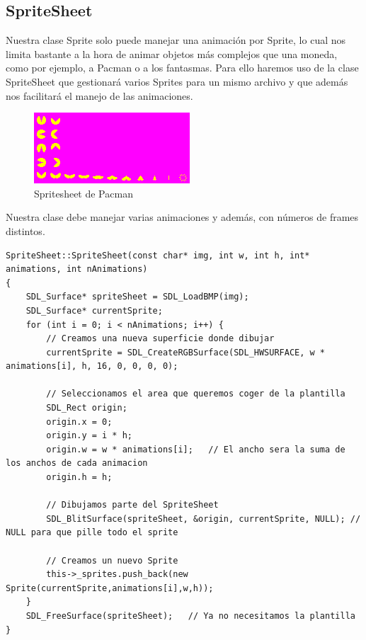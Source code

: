 \documentclass[parskip=half*]{scrartcl}
\begin{document}
	\subsection{SpriteSheet}
		Nuestra clase Sprite solo puede manejar una animaci\'on por Sprite, lo cual nos limita bastante a la hora de animar objetos m\'as complejos que una moneda, como por ejemplo, a Pacman o a los fantasmas. Para ello haremos uso de la clase SpriteSheet que gestionar\'a varios Sprites para un mismo archivo y que adem\'as nos facilitar\'a el manejo de las animaciones.

		\begin{figure}
			\centering
			\includegraphics{MulticocoSDL/img/pacman_example.png}
			\caption{Spritesheet de Pacman}
		\end{figure}

		Nuestra clase debe manejar varias animaciones y adem\'as, con n\'umeros de frames distintos.

		\begin{lstlisting}
SpriteSheet::SpriteSheet(const char* img, int w, int h, int* animations, int nAnimations)
{  
    SDL_Surface* spriteSheet = SDL_LoadBMP(img);    
    SDL_Surface* currentSprite;
    for (int i = 0; i < nAnimations; i++) {
        // Creamos una nueva superficie donde dibujar
        currentSprite = SDL_CreateRGBSurface(SDL_HWSURFACE, w * animations[i], h, 16, 0, 0, 0, 0);
        
        // Seleccionamos el area que queremos coger de la plantilla
        SDL_Rect origin;
        origin.x = 0;
        origin.y = i * h;
        origin.w = w * animations[i];   // El ancho sera la suma de los anchos de cada animacion
        origin.h = h;
        
        // Dibujamos parte del SpriteSheet
        SDL_BlitSurface(spriteSheet, &origin, currentSprite, NULL); // NULL para que pille todo el sprite
        
        // Creamos un nuevo Sprite
        this->_sprites.push_back(new Sprite(currentSprite,animations[i],w,h));
    }
    SDL_FreeSurface(spriteSheet);   // Ya no necesitamos la plantilla    
}
		\end{lstlisting}
\end{document}
